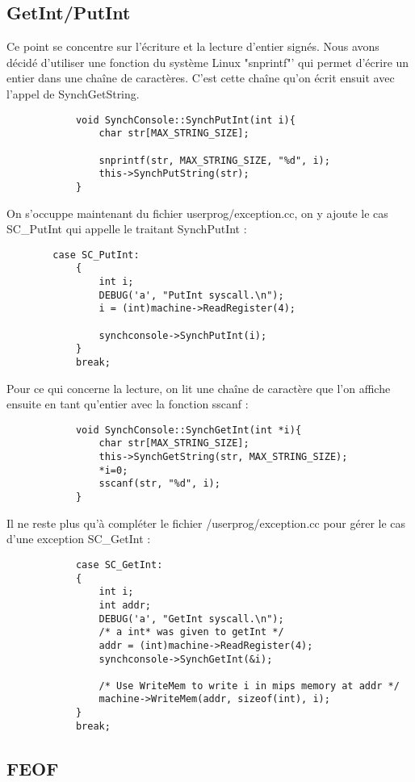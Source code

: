 \documentclass[a4paper,10pt]{article}
\begin{document}
    \subsection{GetInt/PutInt}
        Ce point se concentre sur l'écriture et la lecture d'entier signés. Nous avons décidé d'utiliser une fonction du système Linux "snprintf"' qui permet d'écrire un entier dans une chaîne de caractères. C'est cette chaîne qu'on écrit ensuit avec l'appel de SynchGetString.
        \begin{lstlisting}
            void SynchConsole::SynchPutInt(int i){
                char str[MAX_STRING_SIZE];

                snprintf(str, MAX_STRING_SIZE, "%d", i);
                this->SynchPutString(str);
            }
        \end{lstlisting}
        On s'occuppe maintenant du fichier userprog/exception.cc, on y ajoute le cas SC\_PutInt qui appelle le traitant SynchPutInt :
        \begin{lstlisting}
        case SC_PutInt:
            {
                int i;
                DEBUG('a', "PutInt syscall.\n");
                i = (int)machine->ReadRegister(4);

                synchconsole->SynchPutInt(i);
            }
            break;
        \end{lstlisting}
        Pour ce qui concerne la lecture, on lit une chaîne de caractère que l'on affiche ensuite en tant qu'entier avec la fonction sscanf :
        \begin{lstlisting}
            void SynchConsole::SynchGetInt(int *i){
                char str[MAX_STRING_SIZE];
                this->SynchGetString(str, MAX_STRING_SIZE);
                *i=0;
                sscanf(str, "%d", i);
            }
        \end{lstlisting}
        Il ne reste plus qu'à compléter le fichier /userprog/exception.cc pour gérer le cas d'une exception SC\_GetInt :
        \begin{lstlisting}
            case SC_GetInt:
            {
                int i;
                int addr;
                DEBUG('a', "GetInt syscall.\n");
                /* a int* was given to getInt */
                addr = (int)machine->ReadRegister(4);
                synchconsole->SynchGetInt(&i);

                /* Use WriteMem to write i in mips memory at addr */
                machine->WriteMem(addr, sizeof(int), i);
            }
            break;
        \end{lstlisting}
    \subsection{FEOF}
\end{document}
